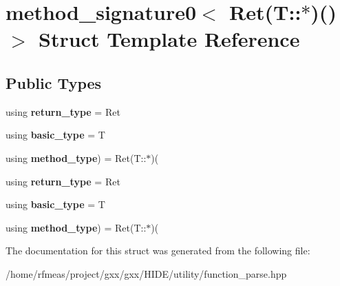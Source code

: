 \hypertarget{structmethod__signature0_3_01Ret_07T_1_1_5_08_07_08_4}{}\section{method\+\_\+signature0$<$ Ret(T\+:\+:$\ast$)()$>$ Struct Template Reference}
\label{structmethod__signature0_3_01Ret_07T_1_1_5_08_07_08_4}
\subsection*{Public Types}
\begin{DoxyCompactItemize}
\item 
using {\bfseries return\+\_\+type} = Ret\hypertarget{structmethod__signature0_3_01Ret_07T_1_1_5_08_07_08_4_a05bf86210e163431e32746ab97885085}{}\label{structmethod__signature0_3_01Ret_07T_1_1_5_08_07_08_4_a05bf86210e163431e32746ab97885085}

\item 
using {\bfseries basic\+\_\+type} = T\hypertarget{structmethod__signature0_3_01Ret_07T_1_1_5_08_07_08_4_a5d0ffc437d25cf3d9931f80f8adb982d}{}\label{structmethod__signature0_3_01Ret_07T_1_1_5_08_07_08_4_a5d0ffc437d25cf3d9931f80f8adb982d}

\item 
using {\bfseries method\+\_\+type}) = Ret(T\+::$\ast$)(\hypertarget{structmethod__signature0_3_01Ret_07T_1_1_5_08_07_08_4_a5b1a1d72fee23ab3cfee4703b16a7886}{}\label{structmethod__signature0_3_01Ret_07T_1_1_5_08_07_08_4_a5b1a1d72fee23ab3cfee4703b16a7886}

\item 
using {\bfseries return\+\_\+type} = Ret\hypertarget{structmethod__signature0_3_01Ret_07T_1_1_5_08_07_08_4_a05bf86210e163431e32746ab97885085}{}\label{structmethod__signature0_3_01Ret_07T_1_1_5_08_07_08_4_a05bf86210e163431e32746ab97885085}

\item 
using {\bfseries basic\+\_\+type} = T\hypertarget{structmethod__signature0_3_01Ret_07T_1_1_5_08_07_08_4_a5d0ffc437d25cf3d9931f80f8adb982d}{}\label{structmethod__signature0_3_01Ret_07T_1_1_5_08_07_08_4_a5d0ffc437d25cf3d9931f80f8adb982d}

\item 
using {\bfseries method\+\_\+type}) = Ret(T\+::$\ast$)(\hypertarget{structmethod__signature0_3_01Ret_07T_1_1_5_08_07_08_4_a5b1a1d72fee23ab3cfee4703b16a7886}{}\label{structmethod__signature0_3_01Ret_07T_1_1_5_08_07_08_4_a5b1a1d72fee23ab3cfee4703b16a7886}

\end{DoxyCompactItemize}


The documentation for this struct was generated from the following file\+:\begin{DoxyCompactItemize}
\item 
/home/rfmeas/project/gxx/gxx/\+H\+I\+D\+E/utility/function\+\_\+parse.\+hpp\end{DoxyCompactItemize}
